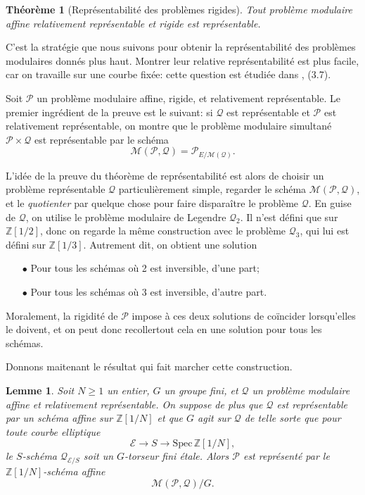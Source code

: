 \documentclass[11pt,a4paper]{article}
\newcommand{\Z}{\mathbb{Z}}
\newcommand{\E}{\mathcal{E}}
\renewcommand{\Pr}{\mathcal{P}}
\newcommand{\Qr}{\mathcal{Q}}
\newcommand{\M}{\mathcal{M}}
\newcommand{\vers}{\longrightarrow}
\newcommand{\Spec}{\mathrm{Spec}\,}
\newtheorem*{thm}{Théorème}
\newtheorem*{lem}{Lemme}
\theoremstyle{definition}
\begin{document}
\begin{thm}[Représentabilité des problèmes rigides]
Tout problème modulaire affine relativement représentable et rigide est représentable.
\end{thm}

C'est la stratégie que nous suivons pour obtenir la représentabilité des problèmes modulaires donnés plus haut. Montrer leur relative représentabilité est plus facile, car on travaille sur une courbe fixée: cette question est étudiée dans \cite{KaMa}, (3.7).

Soit $\Pr$ un problème modulaire affine, rigide, et relativement représentable. Le premier ingrédient de la preuve est le suivant: si $\Qr$ est représentable et $\Pr$ est relativement représentable, on montre que le problème modulaire \og simultané\fg\ $\Pr\times\Qr$ est représentable par le schéma 
$$\M(\Pr, \Qr) = \Pr_{E/\M(\Qr)}.$$

L'idée de la preuve du théorème de représentabilité est alors de choisir un problème représentable $\Qr$ particulièrement simple, regarder le schéma $\M(\Pr, \Qr)$, et le \emph{quotienter} par quelque chose pour faire disparaître le problème $\Qr$. En guise de $\Qr$, on utilise le problème modulaire de Legendre $\Qr_2$. Il n'est défini que sur $\Z[1/2]$, donc on regarde la même construction avec le problème $\Qr_3$, qui lui est défini sur $\Z[1/3]$. Autrement dit, on obtient une solution

\begin{itemize}
\item[$\bullet$] Pour tous les schémas où 2 est inversible, d'une part;
\item[$\bullet$] Pour tous les schémas où 3 est inversible, d'autre part.
\end{itemize}
Moralement, la rigidité de $\Pr$ impose à ces deux solutions de coïncider lorsqu'elles le doivent, et on peut donc \og recoller\fg tout cela en une solution pour tous les schémas.

Donnons maitenant le résultat qui fait marcher cette construction.

\begin{lem}
Soit $N\geq 1$ un entier, $G$ un groupe fini, et $\Qr$ un problème modulaire affine et relativement représentable. On suppose de plus que $\Qr$ est représentable par un schéma affine sur $\Z[1/N]$ et que $G$ agit sur $\Qr$ de telle sorte que pour toute courbe elliptique
$$\E\vers S\vers \Spec \Z[1/N],$$
le $S$-schéma $\Qr_{\E/S}$ soit un $G$-torseur fini étale. Alors $\Pr$ est représenté par le $\Z[1/N]$-schéma affine
$$\M(\Pr,\Qr)/G.$$
\end{lem}
\end{document}
